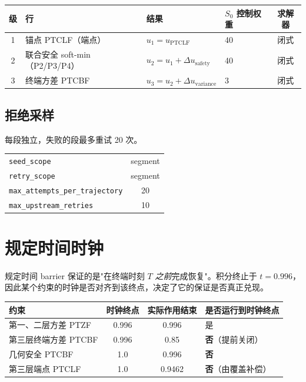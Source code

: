 \documentclass[11pt,a4paper]{ctexart}
\newcommand{\cf}[1]{\texttt{\small #1}}
\begin{document}
\begin{center}
\small
\begin{tabular}{@{}clllc@{}}
\toprule
\textbf{级} & \textbf{行} & \textbf{结果} & \textbf{$S_0$ 控制权重} & \textbf{求解器} \\
\midrule
1 & 锚点 PTCLF（端点） & $u_1=u_{\mathrm{PTCLF}}$ & 40 & 闭式 \\
2 & 联合安全 soft-min（P2/P3/P4） & $u_2=u_1+\Delta u_{\mathrm{safety}}$ & 40 & 闭式 \\
3 & 终端方差 PTCBF & $u_3=u_2+\Delta u_{\mathrm{variance}}$ & 3 & 闭式 \\
\bottomrule
\end{tabular}
\end{center}

\subsection{拒绝采样}
每段独立，失败的段最多重试 20 次。

\begin{center}
\small
\begin{tabular}{@{}lc@{}}
\toprule
\cf{seed\_scope} & segment \\
\cf{retry\_scope} & segment \\
\cf{max\_attempts\_per\_trajectory} & 20 \\
\cf{max\_upstream\_retries} & 10 \\
\bottomrule
\end{tabular}
\end{center}

\section{规定时间时钟}

规定时间 barrier 保证的是"在终端时刻 $T$ \emph{之前}完成恢复"。积分终止于 $t=0.996$，因此某个约束的时钟是否对齐到该终点，决定了它的保证是否真正兑现。

\begin{center}
\small
\begin{tabular}{@{}lccl@{}}
\toprule
\textbf{约束} & \textbf{时钟终点} & \textbf{实际作用结束} & \textbf{是否运行到时钟终点} \\
\midrule
第一、二层方差 PTZF & 0.996 & 0.996 & 是 \\
第三层终端方差 PTCBF & 0.996 & 0.85 & \textbf{否}（提前关闭） \\
几何安全 PTCBF & 1.0 & 0.996 & \textbf{否} \\
第三层端点 PTCLF & 1.0 & 0.9462 & \textbf{否}（由覆盖补偿） \\
\bottomrule
\end{tabular}
\end{center}
\end{document}
